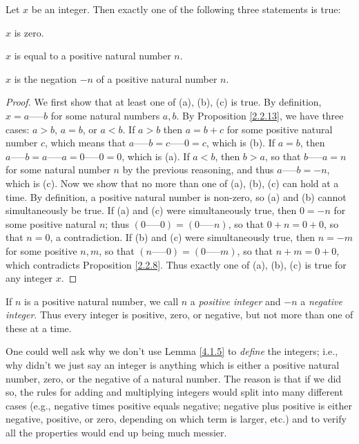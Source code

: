 \begin{lemma}\label{4.1.5}
Let \(x\) be an integer.
Then exactly one of the following three statements is true:
\begin{enumerate*}
    \item \(x\) is zero.
    \item \(x\) is equal to a positive natural number \(n\).
    \item \(x\) is the negation \(-n\) of a positive natural number \(n\).
\end{enumerate*}
\end{lemma}

\begin{proof}
We first show that at least one of (a), (b), (c) is true.
By definition, \(x = a \text{-----} b\) for some natural numbers \(a, b\).
By Proposition \ref{2.2.13}, we have three cases: \(a > b\), \(a = b\), or \(a < b\).
If \(a > b\) then \(a = b + c\) for some positive natural number \(c\), which means that \(a \text{-----} b = c \text{-----} 0 = c\), which is (b).
If \(a = b\), then \(a \text{-----} b = a \text{-----} a = 0 \text{-----} 0 = 0\), which is (a).
If \(a < b\), then \(b > a\), so that \(b \text{-----} a = n\) for some natural number \(n\) by the previous reasoning, and thus \(a \text{-----} b = -n\), which is (c).
Now we show that no more than one of (a), (b), (c) can hold at a time.
By definition, a positive natural number is non-zero, so (a) and (b) cannot simultaneously be true.
If (a) and (c) were simultaneously true, then \(0 = -n\) for some positive natural \(n\);
thus \((0 \text{-----} 0) = (0 \text{-----} n)\), so that \(0 + n = 0 + 0\), so that \(n = 0\), a contradiction.
If (b) and (c) were simultaneously true, then \(n = -m\) for some positive \(n, m\), so that \((n \text{-----} 0) = (0 \text{-----} m)\), so that \(n + m = 0 + 0\), which contradicts Proposition \ref{2.2.8}.
Thus exactly one of (a), (b), (c) is true for any integer \(x\).
\end{proof}

\begin{note}
If \(n\) is a positive natural number, we call \(n\) a \emph{positive integer} and \(-n\) a \emph{negative integer}.
Thus every integer is positive, zero, or negative, but not more than one of these at a time.
\end{note}

\begin{note}
One could well ask why we don’t use Lemma \ref{4.1.5} to \emph{define} the integers;
i.e., why didn’t we just say an integer is anything which is either a positive natural number, zero, or the negative of a natural number.
The reason is that if we did so, the rules for adding and multiplying integers would split into many different cases (e.g., negative times positive equals negative; negative plus positive is either negative, positive, or zero, depending on which term is larger, etc.) and to verify all the properties would end up being much messier.
\end{note}

